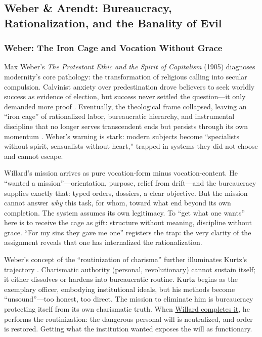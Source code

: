 \subsection*{Weber \& Arendt: Bureaucracy, Rationalization, and the Banality of Evil}
\label{ssec:v-weber-arendt}

\subsubsection*{Weber: The Iron Cage and Vocation Without Grace}
Max Weber's \textit{The Protestant Ethic and the Spirit of Capitalism} (1905) diagnoses
modernity's core pathology: the transformation of religious calling into secular compulsion.
Calvinist anxiety over predestination drove believers to seek worldly success as evidence of
election, but success never settled the question---it only demanded more proof
\parencite{WeberProtestant2002}. Eventually, the theological frame collapsed, leaving an ``iron
cage'' of rationalized labor, bureaucratic hierarchy, and instrumental discipline that no
longer serves transcendent ends but persists through its own momentum
\parencite{WeberProtestant2002}. Weber's warning is stark: modern subjects become ``specialists
without spirit, sensualists without heart,'' trapped in systems they did not choose and cannot
escape.

Willard's mission arrives as pure vocation-form minus vocation-content. He ``wanted a
mission''---orientation, purpose, relief from drift---and the bureaucracy supplies exactly
that: typed orders, dossiers, a clear objective. But the mission cannot answer \emph{why} this
task, for whom, toward what end beyond its own completion. The system assumes its own
legitimacy. To ``get what one wants'' here is to receive the cage as gift: structure without
meaning, discipline without grace. ``For my sins they gave me one'' registers the trap: the
very clarity of the assignment reveals that one has internalized the rationalization.

Weber's concept of the ``routinization of charisma'' further illuminates Kurtz's trajectory
\parencite{WeberProtestant2002}. Charismatic authority (personal, revolutionary) cannot sustain
itself; it either dissolves or hardens into bureaucratic routine. Kurtz begins as the
exemplary officer, embodying institutional ideals, but his methods become ``unsound''---too
honest, too direct. The mission to eliminate him is bureaucracy protecting itself from its own
charismatic truth. When \hyperref[scene:assassination]{Willard completes it}, he performs the
routinization: the dangerous personal will is neutralized, and order is restored. Getting what
the institution wanted exposes the will as functionary.

